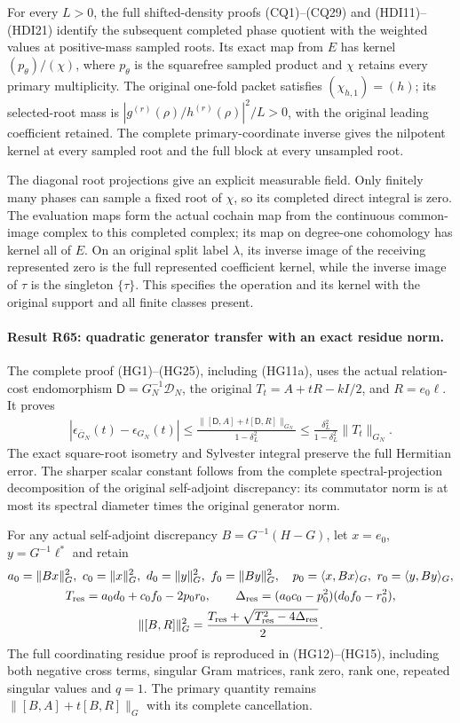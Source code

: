 For every $L>0$, the full shifted-density proofs (CQ1)--(CQ29) and
(HDI11)--(HDI21) identify the subsequent completed phase quotient with the weighted
values at positive-mass sampled roots. Its exact map from $E$ has
kernel $(p_\theta)/(\chi)$, where $p_\theta$ is the squarefree
sampled product and $\chi$ retains every primary multiplicity.
The original one-fold packet satisfies $(\chi_{h,1})=(h)$; its
selected-root mass is
$|g^{(r)}(\rho)/h^{(r)}(\rho)|^2/L>0$, with the original leading
coefficient retained. The complete primary-coordinate inverse gives
the nilpotent kernel at every sampled root and the full block at
every unsampled root.

The diagonal root projections give an explicit measurable field.
Only finitely many phases can sample a fixed root of $\chi$, so
its completed direct integral is zero. The evaluation maps form
the actual cochain map from the continuous common-image complex
to this completed complex; its map on degree-one cohomology has
kernel all of $E$. On an original split label $\lambda$, its
inverse image of the receiving represented zero is the full
represented coefficient kernel, while the inverse image of $\tau$
is the singleton $\{\tau\}$. This specifies the operation and its
kernel with the original support and all finite classes present.

\paragraph{Result R65: quadratic generator transfer with an exact residue norm.}
The complete proof (HG1)--(HG25), including (HG11a), uses the
actual relation-cost endomorphism $\mathsf D=G_N^{-1}\mathscr D_N$,
the original $T_t=A+tR-kI/2$, and $R=e_0\ell$. It proves
\[
\begin{gathered}
 |\epsilon_{\overline G_N}(t)-\epsilon_{G_N}(t)|
 \le\frac{\|[\mathsf D,A]+t[\mathsf D,R]\|_{G_N}}{1-\delta_L^2}
 \le\frac{\delta_L^2}{1-\delta_L^2}\|T_t\|_{G_N}.
\end{gathered}
\]
The exact square-root isometry and Sylvester integral preserve
the full Hermitian error. The sharper scalar constant follows
from the complete spectral-projection decomposition of the
original self-adjoint discrepancy: its commutator norm is at
most its spectral diameter times the original generator norm.

For any actual self-adjoint discrepancy $B=G^{-1}(H-G)$, let
$x=e_0$, $y=G^{-1}\ell^*$ and retain
\[
\begin{gathered}
 a_0=\|Bx\|_G^2,\ c_0=\|x\|_G^2,\ d_0=\|y\|_G^2,
 \ f_0=\|By\|_G^2,\quad
 p_0=\langle x,Bx\rangle_G,\ r_0=\langle y,By\rangle_G,\\
 T_{\rm res}=a_0d_0+c_0f_0-2p_0r_0,\qquad
 \Delta_{\rm res}=(a_0c_0-p_0^2)(d_0f_0-r_0^2),\\
 \|[B,R]\|_G^2=
 \frac{T_{\rm res}+\sqrt{T_{\rm res}^2-4\Delta_{\rm res}}}{2}.
\end{gathered}
\]
The full coordinating residue proof is reproduced in (HG12)--(HG15),
including both negative cross terms, singular Gram matrices,
rank zero, rank one, repeated singular values and $q=1$.
The primary quantity remains $\|[B,A]+t[B,R]\|_G$ with its
complete cancellation.

